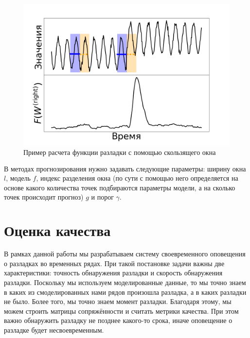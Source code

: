 \documentclass[%
12pt,
master,  %
natbib,      %
subf,        %
substylefile = spbu.rtx,
href,        %
colorlinks,  %
]{disser}
\begin{document}
\begin{figure}[!hhh]
	\begin{center}
		\includegraphics[width=12cm]{approaches_first_6_ru}
	\end{center}
	\vspace{-5mm}\caption{Пример расчета функции разладки с помощью скользящего окна}
	\label{fig:predicition_example_2}
\end{figure}

В методах прогнозирования нужно задавать следующие параметры: ширину окна $l$, модель $f$, индекс разделения окна (по сути с помощью него определяется на основе какого количества точек подбираются параметры модели, а на сколько точек происходит прогноз) $g$ и порог $\gamma$.



\section{Оценка качества}

В рамках данной работы мы разрабатываем систему своевременного оповещения о разладках во временных рядах. При такой постановке задачи важны две характеристики: точность обнаружения разладки и скорость обнаружения разладки. Поскольку мы используем моделированные данные, то мы точно знаем в каких из смоделированных нами рядов произошла разладка, а в каких разладки не было. Более того, мы точно знаем момент разладки. Благодаря этому, мы можем строить матрицы сопряжённости и считать метрики качества. При этом важно обнаружить разладку не позднее какого-то срока, иначе оповещение о разладке будет несвоевременным. 
\end{document}
